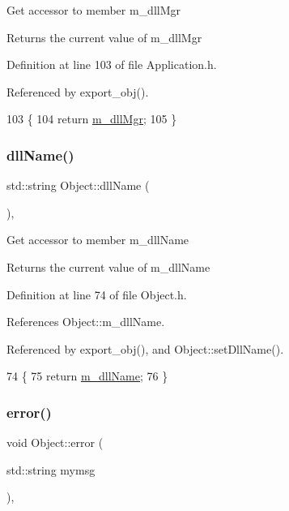 Get accessor to member m\+\_\+dll\+Mgr \begin{DoxyReturn}{Returns}
the current value of m\+\_\+dll\+Mgr 
\end{DoxyReturn}


Definition at line 103 of file Application.\+h.



Referenced by export\+\_\+obj().


\begin{DoxyCode}
103                     \{
104     \textcolor{keywordflow}{return} \hyperlink{classApplication_a66b06cbeb824fe00ecd11499fcf01c55}{m\_dllMgr};
105   \}
\end{DoxyCode}
\mbox{\label{classObject_a2e3947f2870094c332d7454117f3ec63}} 
\subsubsection{\texorpdfstring{dll\+Name()}{dllName()}}
{\footnotesize\ttfamily std\+::string Object\+::dll\+Name (\begin{DoxyParamCaption}{ }\end{DoxyParamCaption})\hspace{0.3cm}{\ttfamily [inline]}, {\ttfamily [inherited]}}

Get accessor to member m\+\_\+dll\+Name \begin{DoxyReturn}{Returns}
the current value of m\+\_\+dll\+Name 
\end{DoxyReturn}


Definition at line 74 of file Object.\+h.



References Object\+::m\+\_\+dll\+Name.



Referenced by export\+\_\+obj(), and Object\+::set\+Dll\+Name().


\begin{DoxyCode}
74                        \{
75     \textcolor{keywordflow}{return} \hyperlink{classObject_a01afbeacebb8db6831559972ec362eb3}{m\_dllName};
76   \}  
\end{DoxyCode}
\mbox{\label{classObject_a204a95f57818c0f811933917a30eff45}} 
\subsubsection{\texorpdfstring{error()}{error()}\hspace{0.1cm}{\footnotesize\ttfamily [1/2]}}
{\footnotesize\ttfamily void Object\+::error (\begin{DoxyParamCaption}\item[{std\+::string}]{mymsg }\end{DoxyParamCaption})\hspace{0.3cm}{\ttfamily [inline]}, {\ttfamily [inherited]}}



